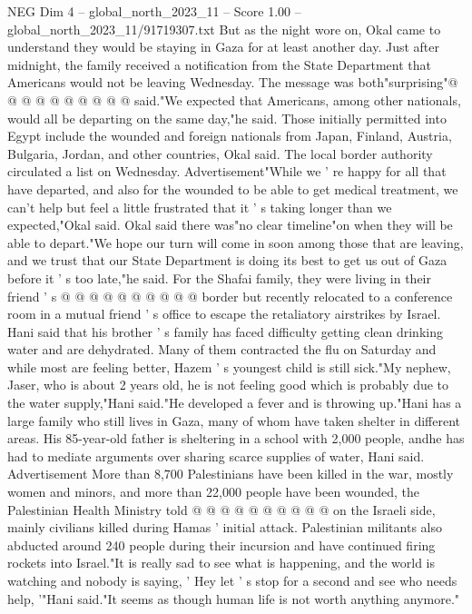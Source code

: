 \begin{textsample}{NEG Dim 4 – global\_north\_2023\_11 – Score 1.00 – global\_north\_2023\_11/91719307.txt}
But as the night wore on, Okal came to understand they would be staying in Gaza for at least another day.
Just after midnight, the family received a notification from the State Department that Americans would not be leaving Wednesday.
The message was both"surprising"@ @ @ @ @ @ @ @ @ @ said."We expected that Americans, among other nationals, would all be departing on the same day,"he said.
Those initially permitted into Egypt include the wounded and foreign nationals from Japan, Finland, Austria, Bulgaria, Jordan, and other countries, Okal said.
The local border authority circulated a list on Wednesday.
Advertisement"While we ' re happy for all that have departed, and also for the wounded to be able to get medical treatment, we can't help but feel a little frustrated that it ' s taking longer than we expected,"Okal said.
Okal said there was"no clear timeline"on when they will be able to depart."We hope our turn will come in soon among those that are leaving, and we trust that our State Department is doing its best to get us out of Gaza before it ' s too late,"he said.
For the Shafai family, they were living in their friend ' s @ @ @ @ @ @ @ @ @ @ border but recently relocated to a conference room in a mutual friend ' s office to escape the retaliatory airstrikes by Israel.
Hani said that his brother ' s family has faced difficulty getting clean drinking water and are dehydrated.
Many of them contracted the flu on Saturday and while most are feeling better, Hazem ' s youngest child is still sick."My nephew, Jaser, who is about 2 years old, he is not feeling good which is probably due to the water supply,"Hani said."He developed a fever and is throwing up."Hani has a large family who still lives in Gaza, many of whom have taken shelter in different areas.
His 85-year-old father is sheltering in a school with 2,000 people, andhe has had to mediate arguments over sharing scarce supplies of water, Hani said.
Advertisement More than 8,700 Palestinians have been killed in the war, mostly women and minors, and more than 22,000 people have been wounded, the Palestinian Health Ministry told @ @ @ @ @ @ @ @ @ @ on the Israeli side, mainly civilians killed during Hamas ' initial attack.
Palestinian militants also abducted around 240 people during their incursion and have continued firing rockets into Israel."It is really sad to see what is happening, and the world is watching and nobody is saying, ' Hey let ' s stop for a second and see who needs help, '"Hani said."It seems as though human life is not worth anything anymore."

\end{textsample}
